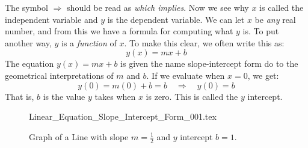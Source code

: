 \documentclass[crop=false,class=book,oneside]{standalone}                      %
\begin{document}
            The symbol $\Longrightarrow$ should be read as
            \textit{which implies}. Now we see why $x$ is called the
            independent variable and $y$ is the dependent variable. We can let
            $x$ be \textit{any} real number, and from this we have a formula
            for computing what $y$ is. To put another way, $y$ is a
            \textit{function} of $x$. To make this clear, we often write
            this as:
            \begin{equation}
                y(x)=mx+b
            \end{equation}
            The equation $y(x)=mx+b$ is given the name slope-intercept form do
            to the geometrical interpretations of $m$ and $b$. If we evaluate
            when $x=0$, we get:
            \begin{equation}
                y(0)=m(0)+b=b
                \quad\Longrightarrow\quad
                y(0)=b
            \end{equation}
            That is, $b$ is the value $y$ takes when $x$ is zero. This is
            called the $y$ intercept.
            \begin{figure}
                \centering
                \captionsetup{type=figure}
                {Linear_Equation_Slope_Intercept_Form_001.tex}
                \caption[Example of a Line in Slope Intercept Form.]
                    {Graph of a Line with slope $m=\frac{1}{2}$
                     and $y$ intercept $b=1$.}
                \label{fig:Slope_Intercept_Form_001}
            \end{figure}
\end{document}
